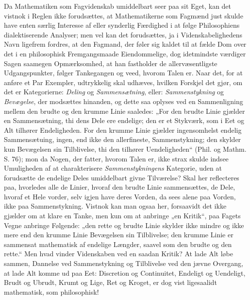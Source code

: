 \documentclass[12pt,a4paper]{book}
\begin{document}
Da Mathematiken som Fagvidenskab umiddelbart seer
paa sit Eget, kan det vistnok i Reglen ikke forudsættes, at
Mathematikerne som Fagmænd just skulde have enten særlig
Interesse af eller synderlig Færdighed i at følge Philosophiens
dialektiserende Analyser; men vel kan det forudsættes, ja i
Videnskabelighedens Navn ligefrem fordres, at den Fagmand,
der føler sig kaldet til at fælde Dom over det i en philosophisk
Fremgangsmaade Eiendommelige, dog idetmindste værdiger
Sagen saamegen Opmærksomhed, at han fastholder de
allervæsentligste Udgangspunkter, følger Tankegangen og veed,
hvorom Talen er. Naar det, for at anføre et Par Exempler,
udtrykkelig skal udhæves, hvilken Forskjel det gjør, om det er
Kategorierne: \emph{Deling} og \emph{Sammensætning}, eller:
\emph{Sammenstykning} og \emph{Bevægelse}, der modsættes hinanden, og
dette saa oplyses ved en Sammenligning mellem den brudte
og den krumme Linie saaledes: „For den brudte Linie gjælder
en Sammensætning, thi dens Dele ere endelige; den er et
Stykværk, som i Eet og Alt tilhører Endeligheden. For den
krumme Linie gjælder ingensomhelst endelig Sammensætuing,
ingen, end ikke den allerfineste, Sammenstykning; den skylder
kun Bevægelsen sin Tilblivelse, thi den tilhører Uendeligheden“
(Phil. og Mathm. S. 76); mon da Nogen, der fatter,
hvorom Talen er, ikke strax skulde indsee Umuligheden af at
charakterisere \emph{Sammenstykningens} Kategorie, uden at forudsætte
de endelige Deles umiddelbart givne Tilværelse? Skal
her reflecteres paa, hvorledes alle de Linier, hvoraf den brudte
Linie sammensættes, de Dele, hvoraf et Hele vorder, selv igjen
have deres Vorden, da sees alene paa Vorden, ikke paa
Sammenstykning. Vistnok kan man ogsaa her, forsaavidt det
ikke gjælder om at klare en Tanke, men kun om at anbringe
„en Kritik“, paa Fagets Vegne anbringe Følgende: „den rette
og brudte Linie skylder ikke mindre og ikke mere end den
krumme Linie Bevægelsen sin Tilblivelse; den krumme Linie
er sammensat mathematisk af endelige Længder, saavel som
den brudte og den rette.“ Men hvad vinder Videnskaben
ved en saadan Kritik? At lade Alt løbe sammen, Dannelse
ved Sammenstykning og Tilblivelse ved den jævne Overgang, at
lade Alt komme ud paa Eet: Discretion og Continuitet, Endeligt
og Uendeligt, Brudt og Ubrudt, Krumt og Lige, Ret og
Kroget, er dog vist ligesaalidt mathematisk, som philosophisk!
\end{document}
